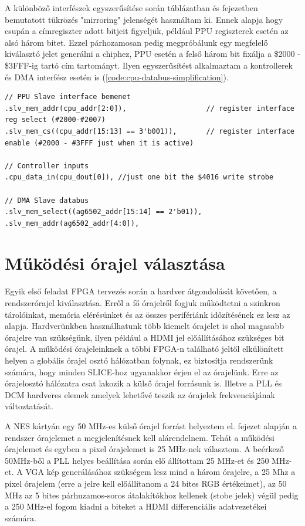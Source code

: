 A különböző interfészek egyszerűsítése során  táblázatban és  fejezetben bemutatott tükrözés "mirroring" jelenségét használtam ki. Ennek alapja hogy csupán a címregiszter adott bitjeit figyeljük, például PPU regiszterek esetén az alsó három bitet. Ezzel párhozamosan pedig megpróbálunk egy megfelelő kiválasztó jelet generálni a chiphez, PPU esetén a felső három bit fixálja a \$2000 - \$3FFF-ig tartó cím tartományt. Ilyen egyszerűsítést alkalmaztam a kontrollerek és DMA interfész esetén is (\ref{code:cpu-databus-simplification}).

\begin{lstlisting}[caption={A CPU adatbusz interfészek egyzserüsítése}, label={code:cpu-databus-simplification}, style=prettyverilog]
// PPU Slave interface bemenet
.slv_mem_addr(cpu_addr[2:0]),      				// register interface reg select (#2000-#2007)
.slv_mem_cs((cpu_addr[15:13] == 3'b001)), 		// register interface enable (#2000 - #3FFF just when it is active)

// Controller inputs
.cpu_data_in(cpu_dout[0]), //just one bit the $4016 write strobe

// DMA Slave databus
.slv_mem_select((ag6502_addr[15:14] == 2'b01)),  
.slv_mem_addr(ag6502_addr[4:0]),\end{lstlisting}

\section{Működési órajel választása}

Egyik első feladat FPGA tervezés során a hardver átgondolását követően, a rendszerórajel kiválasztása. Erről a fő órajelről fogjuk működtetni a szinkron tárolóinkat, memória elérésünket és az összes perifériánk időzítésének ez lesz az alapja. Hardverünkben használhatunk több kiemelt órajelet is ahol magasabb órajelre van szükségünk, ilyen például a HDMI jel előállításához szükséges bit órajel. A működési órajeleinknek a többi FPGA-n található jeltől elkülönített helyen a globális órajel osztó hálózatban folynak, ez biztosítja rendszerünk számára, hogy minden SLICE-hoz ugyanakkor érjen el az órajelünk. Erre az órajelosztó hálózatra csat lakozik a külső órajel forrásunk is. Illetve a PLL és DCM hardveres elemek amelyek lehetővé teszik az órajelek frekvenciájának változtatását.

A NES kártyán egy 50 MHz-es külső órajel forrást helyeztem el.   fejezet alapján a rendszer órajelemet a megjelenítésnek kell alárendelnem. Tehát a működési órajelemet és egyben a pixel órajelemet is 25 MHz-nek választom. A beérkező 50MHz-ből a PLL helyes beállítása során elő állítottam 25 MHz-et és 250 MHz-et. A VGA kép generálásához szükségem lesz mind a három órajelre, a 25 Mhz a pixel órajelem (erre a jelre kell előállítanom a  24 bites RGB értékeimet), az 50 MHz az 5 bites párhuzamos-soros átalakítókhoz kellenek (stobe jelek) végül pedig a 250 MHz-el fogom kiadni a biteket a HDMI differenciális adatvezetékei számára. 


